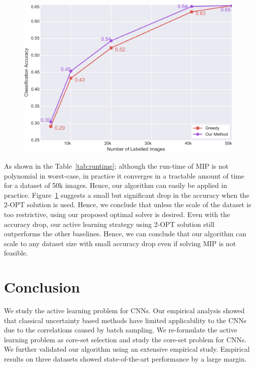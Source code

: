\documentclass{article} %
\begin{document}
\begin{figure}[tb]
\begin{minipage}[t]{0.49\textwidth}
\vspace{4mm}

\includegraphics[width=\textwidth]{mip_100_3.pdf}
\vspace{-2mm}
\label{fig:twoopt}
\end{minipage}
\end{figure}


As shown in the Table~\ref{tab:runtime}; although the run-time of MIP is not polynomial in worst-case, in practice it
converges in a tractable amount of time for a dataset of 50k images. Hence, our algorithm can easily be applied in
practice. Figure~\ref{fig:twoopt} suggests a small but significant drop in the accuracy when the 2-OPT solution is used.
Hence, we conclude that unless the scale of the dataset is too restrictive, using our proposed optimal solver is
desired. Even with the accuracy drop, our active learning strategy using 2-OPT solution still outperforms the other
baselines. Hence, we can conclude that our algorithm can scale to any dataset size with small accuracy drop even if
solving MIP is not feasible.


\section{Conclusion} We study the active learning problem for CNNs. Our empirical analysis showed that classical
uncertainty based methods have limited applicability to the CNNs due to the correlations caused by batch sampling. We
re-formulate the active learning problem as core-set selection and study the core-set problem for CNNs. We further
validated our algorithm using an extensive empirical study. Empirical results on three datasets showed state-of-the-art
performance by a large margin.
\end{document}
